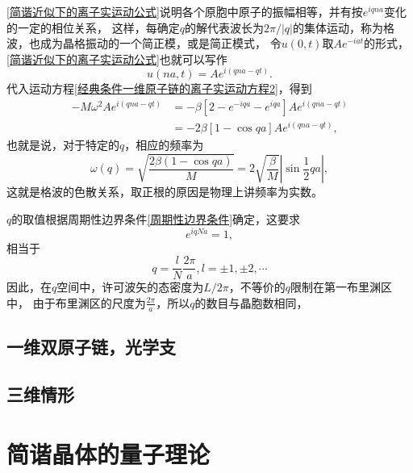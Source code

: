             \autoref{简谐近似下的离子实运动公式}说明各个原胞中原子的振幅相等，并有按$e^{iqna}$变化的一定的相位关系，
            这样，每确定$q$的解代表波长为$2\pi/|q|$的集体运动，称为格波，也成为晶格振动的一个简正模，或是简正模式，
            令$u(0,t)$取$Ae^{-iat}$的形式，\autoref{简谐近似下的离子实运动公式}也就可以写作
            \begin{equation}
                u(na,t)=Ae^{i(qna-qt)}.
            \end{equation}
            代入运动方程\autoref{经典条件一维原子链的离子实运动方程2}，得到
            \begin{equation}
                \begin{aligned}
                    -M\omega^2Ae^{i(qna-qt)}&=-\beta[2-e^{-iqa}-e^{iqa}]Ae^{i(qna-qt)}\\
                    &=-2\beta[1-\cos{qa}]Ae^{i(qna-qt)},
                \end{aligned}
            \end{equation}
            也就是说，对于特定的$q$，相应的频率为
            \begin{equation}
                \omega(q)=\sqrt{\frac{2\beta(1-\cos{qa})}{M}}=2\sqrt{\frac{\beta}{M}}\left\vert \sin{\frac{1}{2}qa}\right\vert,
            \end{equation}
            这就是格波的色散关系，取正根的原因是物理上讲频率为实数。

            $q$的取值根据周期性边界条件\autoref{周期性边界条件}确定，这要求
            \begin{equation}
                e^{iqNa}=1,
            \end{equation}
            相当于
            \begin{equation}
                q=\frac{l}{N}\frac{2\pi}{a},l=\pm1,\pm2,\cdots
            \end{equation}
            因此，在$q$空间中，许可波矢的态密度为$L/2\pi$，不等价的$q$限制在第一布里渊区中，
            由于布里渊区的尺度为$\frac{2\pi}{a}$，所以$q$的数目与晶胞数相同，
            
        \subsection{一维双原子链，光学支}
        \subsection{三维情形}
    \section{简谐晶体的量子理论}
